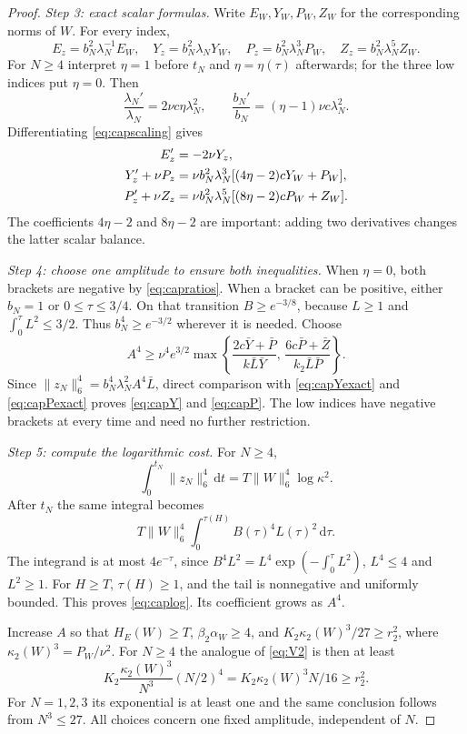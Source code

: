 \documentclass[11pt,a4paper]{article}
\theoremstyle{definition}\newtheorem{definition}[theorem]{Definition}
\theoremstyle{remark}\newtheorem{remark}[theorem]{Remark}
\newcommand{\dd}{\,\mathrm d}
\newcommand{\norm}[1]{\lVert #1\rVert}
\numberwithin{equation}{section}
\begin{document}
\begin{proof}
\emph{Step 3: exact scalar formulas.}
Write $E_W,Y_W,P_W,Z_W$ for the corresponding norms of $W$. For every index,
\begin{equation}\label{eq:capscaling}
 E_z=b_N^2\lambda_N^{-1}E_W,\quad
 Y_z=b_N^2\lambda_NY_W,\quad
 P_z=b_N^2\lambda_N^3P_W,\quad
 Z_z=b_N^2\lambda_N^5Z_W.
\end{equation}
For $N\ge4$ interpret $\eta=1$ before $t_N$ and $\eta=\eta(\tau)$ afterwards; for the three low indices put $\eta=0$. Then
\[
 \frac{\lambda_N'}{\lambda_N}=2\nu c\eta\lambda_N^2,
 \qquad \frac{b_N'}{b_N}=(\eta-1)\nu c\lambda_N^2.
\]
Differentiating \eqref{eq:capscaling} gives
\begin{align}
 E_z'&=-2\nu Y_z,\notag\\
 Y_z'+\nu P_z&=\nu b_N^2\lambda_N^3[(4\eta-2)cY_W+P_W],\label{eq:capYexact}\\
 P_z'+\nu Z_z&=\nu b_N^2\lambda_N^5[(8\eta-2)cP_W+Z_W].\label{eq:capPexact}
\end{align}
The coefficients $4\eta-2$ and $8\eta-2$ are important: adding two derivatives changes the latter scalar balance.

\emph{Step 4: choose one amplitude to ensure both inequalities.}
When $\eta=0$, both brackets are negative by \eqref{eq:capratios}. When a bracket can be positive, either $b_N=1$ or $0\le\tau\le3/4$. On that transition $B\ge e^{-3/8}$, because $L\ge1$ and $\int_0^\tau L^2\le3/2$. Thus $b_N^4\ge e^{-3/2}$ wherever it is needed. Choose
\begin{equation}\label{eq:capamplitude}
 A^4\ge\nu^4e^{3/2}
 \max\left\{
 \frac{2c\bar Y+\bar P}{k\bar L\bar Y},\,
 \frac{6c\bar P+\bar Z}{k_2\bar L\bar P}
 \right\}.
\end{equation}
Since $\norm{z_N}_6^4=b_N^4\lambda_N^2A^4\bar L$, direct comparison with \eqref{eq:capYexact} and \eqref{eq:capPexact} proves \eqref{eq:capY} and \eqref{eq:capP}. The low indices have negative brackets at every time and need no further restriction.

\emph{Step 5: compute the logarithmic cost.}
For $N\ge4$,
\[
 \int_0^{t_N}\norm{z_N}_6^4\dd t
 =T\norm W_6^4\log\kappa^2.
\]
After $t_N$ the same integral becomes
\[
 T\norm W_6^4\int_0^{\tau(H)}B(\tau)^4L(\tau)^2\dd\tau.
\]
The integrand is at most $4e^{-\tau}$, since
$B^4L^2=L^4\exp(-\int_0^\tau L^2)$, $L^4\le4$ and $L^2\ge1$. For $H\ge T$, $\tau(H)\ge1$, and the tail is nonnegative and uniformly bounded. This proves \eqref{eq:caplog}. Its coefficient grows as $A^4$.

Increase $A$ so that $H_E(W)\ge T$, $\beta_2\alpha_W\ge4$, and
$K_2\kappa_2(W)^3/27\ge r_2^2$, where $\kappa_2(W)^3=P_W/\nu^2$. For $N\ge4$ the analogue of \eqref{eq:V2} is then at least
\[
 K_2\frac{\kappa_2(W)^3}{N^3}(N/2)^4
 =K_2\kappa_2(W)^3N/16\ge r_2^2.
\]
For $N=1,2,3$ its exponential is at least one and the same conclusion follows from $N^3\le27$. All choices concern one fixed amplitude, independent of $N$.


\end{proof}
\end{document}
